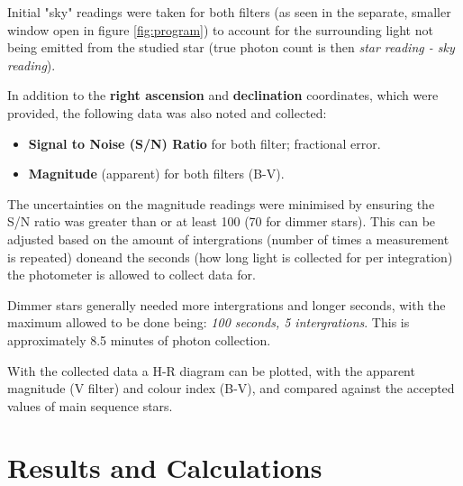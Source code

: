 \documentclass[12pt]{article}
\begin{document}
Initial "sky" readings were taken for both filters (as seen in the separate, smaller window open in figure \ref{fig:program}) to account for the surrounding light not being emitted
from the studied star (true photon count is then \textit{star reading - sky reading}).

In addition to the \textbf{right ascension} and \textbf{declination} coordinates, which were provided, the following data was also noted and collected:

\begin{itemize}
    \item \textbf{Signal to Noise (S/N) Ratio} for both filter; fractional error.
    \item \textbf{Magnitude} (apparent) for both filters (B-V).
\end{itemize}

The uncertainties on the magnitude readings were minimised by ensuring the S/N ratio was greater than or at least 100 (70 for dimmer stars). This can be adjusted based on the amount of intergrations 
(number of times a measurement is repeated) doneand the seconds (how long light is collected for per integration) the photometer is allowed to collect data for. 

Dimmer stars generally needed more intergrations and longer seconds, with the maximum allowed to be done being: \textit{100 seconds, 5 intergrations}. This is approximately 8.5 minutes of photon collection.

With the collected data a H-R diagram can be plotted, with the apparent magnitude (V filter) and colour index (B-V), and compared against the accepted values of main sequence stars.

\section{Results and Calculations} \label{sec:3}
\end{document}
